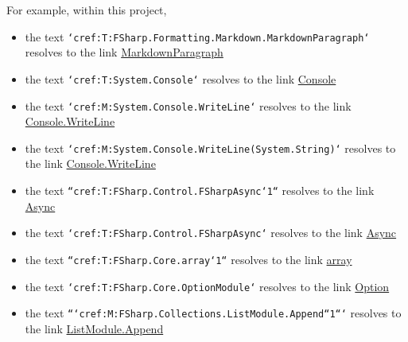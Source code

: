 \documentclass{article}
\begin{document}
For example, within this project,
\begin{itemize}
\item 

the text \texttt{`cref:T:FSharp.Formatting.Markdown.MarkdownParagraph`} resolves to the link \href{https://fsprojects.github.io/FSharp.Formatting/reference/fsharp-formatting-markdown-markdownparagraph.html}{MarkdownParagraph}

\item 

the text \texttt{`cref:T:System.Console`} resolves to the link \href{https://docs.microsoft.com/dotnet/api/system.console}{Console}

\item 

the text \texttt{`cref:M:System.Console.WriteLine`} resolves to the link \href{https://docs.microsoft.com/dotnet/api/system.console.writeline}{Console.WriteLine}

\item 

the text \texttt{`cref:M:System.Console.WriteLine(System.String)`} resolves to the link \href{https://docs.microsoft.com/dotnet/api/system.console.writeline}{Console.WriteLine}

\item 

the text \texttt{``cref:T:FSharp.Control.FSharpAsync`1``} resolves to the link \href{https://fsharp.github.io/fsharp-core-docs/reference/fsharp-control-fsharpasync-1}{Async}

\item 

the text \texttt{`cref:T:FSharp.Control.FSharpAsync`} resolves to the link \href{https://fsharp.github.io/fsharp-core-docs/reference/fsharp-control-fsharpasync}{Async}

\item 

the text \texttt{``cref:T:FSharp.Core.array`1``} resolves to the link \href{https://fsharp.github.io/fsharp-core-docs/reference/fsharp-core-array-1}{array}

\item 

the text \texttt{`cref:T:FSharp.Core.OptionModule`} resolves to the link \href{https://fsharp.github.io/fsharp-core-docs/reference/fsharp-core-optionmodule}{Option}

\item 

the text \texttt{```cref:M:FSharp.Collections.ListModule.Append``1```} resolves to the link \href{https://fsharp.github.io/fsharp-core-docs/reference/fsharp-collections-listmodule\#Append}{ListModule.Append}

\end{itemize}
\end{document}
